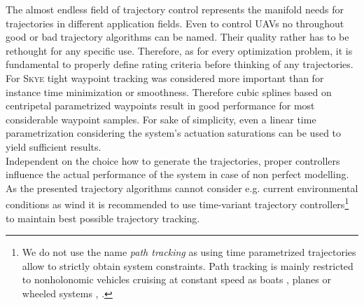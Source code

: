 The almost endless field of trajectory control represents the manifold needs for trajectories in different application fields. 
Even to control UAVs no throughout good or bad trajectory algorithms can be named. Their quality rather has to be rethought for any specific use. Therefore, as for every optimization problem, it is fundamental to properly define rating criteria before thinking of any trajectories. \\
For \textsc{Skye} tight waypoint tracking was considered more important than for instance time minimization or smoothness. Therefore cubic splines based on centripetal parametrized waypoints result in good performance for most considerable waypoint samples.
For sake of simplicity, even a linear time parametrization considering the system's actuation saturations can be used to yield sufficient results. \\
Independent on the choice how to generate the trajectories, proper controllers influence the actual performance of the system in case of non perfect modelling. As the presented trajectory algorithms cannot consider e.g. current environmental conditions as wind it is recommended to use time-variant trajectory controllers\footnote{We do not use the name \textit{path tracking} as using time parametrized trajectories allow to strictly obtain system constraints. Path tracking is mainly restricted to nonholonomic vehicles cruising at constant speed as boats \cite{williams}, planes or wheeled systems \cite{deluca}, \cite{snider}.} to maintain best possible trajectory tracking.
